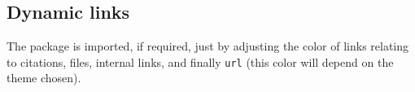 \documentclass{tutodoc}
\begin{document}
\subsection{Dynamic links}

The  package is imported, if required, just by adjusting the color of links relating to citations, files, internal links, and finally \verb#url# (this color will depend on the theme chosen).
\end{document}
